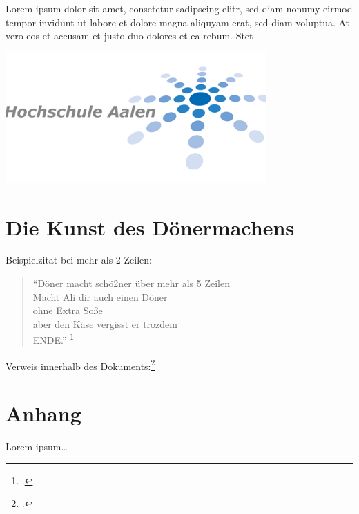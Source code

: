 Lorem ipsum dolor sit amet, consetetur sadipscing elitr, sed diam nonumy eirmod tempor invidunt ut labore et dolore magna aliquyam erat, sed diam voluptua. At vero eos et accusam et justo duo dolores et ea rebum. Stet
\begin{center}
	\includegraphics[width=10cm]{images/institute_logo.png}
\end{center}


\clearpage



\section{Die Kunst des Dönermachens}

Beispielzitat bei mehr als 2 Zeilen:
\begin{quote}
"`Döner macht schö2ner über mehr als 5 Zeilen\\
Macht Ali dir auch einen Döner \\
ohne Extra Soße \\
aber den Käse vergisst er trozdem\\
ENDE."' 
\footcite[Wörtlich übernommen von Ali]{praxishandbuch:bpmn2}
\end{quote}
Verweis innerhalb des Dokuments:\footcite[Vgl. \ref{Referenz} auf Seite
\pageref{Referenz} ]{testarticle}


\begin{figure}[H]
\begin{minipage}{\linewidth}
\begin{center}
\end{center}
\end{minipage}
\end{figure}

\clearpage
\section{Anhang}

Lorem ipsum\ldots
